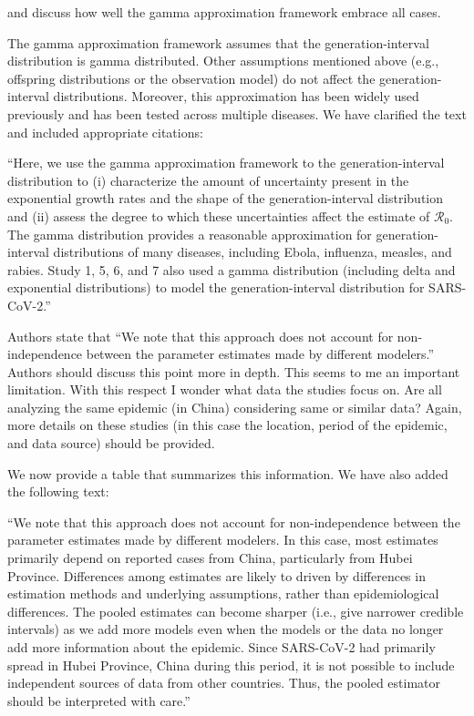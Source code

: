 \documentclass[12pt]{article}
\newcommand{\Ro}{\ensuremath{{\mathcal R}_{0}}\xspace}
\newcommand{\revtext}{\textsf}
\begin{document}
\revtext{and discuss how well the gamma approximation framework embrace all cases.}

The gamma approximation framework assumes that the generation-interval distribution is gamma distributed.
Other assumptions mentioned above (e.g., offspring distributions or the observation model) do not affect the generation-interval distributions.
Moreover, this approximation has been widely used previously and has been tested across multiple diseases.
We have clarified the text and included appropriate citations:

``Here, we use the gamma approximation framework to the generation-interval distribution \citep{nishiura2009transmission, mcbryde2009early, roberts2011early, trichereau2012estimation, nishiura2015theoretical, park2019practical} to (i) characterize the amount of uncertainty present in the exponential growth rates and the shape of the generation-interval distribution and (ii) assess the degree to which these uncertainties affect the estimate of \Ro.
The gamma distribution provides a reasonable approximation for generation-interval distributions of many diseases, including Ebola, influenza, measles, and rabies.
Study 1, 5, 6, and 7 also used a gamma distribution (including delta and exponential distributions) to model the generation-interval distribution for SARS-CoV-2.''

\revtext{
Authors state that “We note that this approach does not account for non- independence between the parameter estimates made by different modelers.” Authors should discuss this point more in depth. This seems to me an important limitation. With this respect I wonder what data the studies focus on. Are all analyzing the same epidemic (in China) considering same or similar data? Again, more details on these studies (in this case the location, period of the epidemic, and data source) should be provided.}

We now provide a table that summarizes this information. We have also added the following text:

``We note that this approach does not account for non-independence between the parameter estimates made by different modelers.
In this case, most estimates primarily depend on reported cases from China, particularly from Hubei Province.
Differences among estimates are likely to driven by differences in estimation methods and underlying assumptions, rather than epidemiological differences.
The pooled estimates can become sharper (i.e., give narrower credible intervals) as we add more models even when the models or the data no longer add more information about the epidemic.
Since SARS-CoV-2 had primarily spread in Hubei Province, China during this period, it is not possible to include independent sources of data from other countries.
Thus, the pooled estimator should be interpreted with care.''
\end{document}
